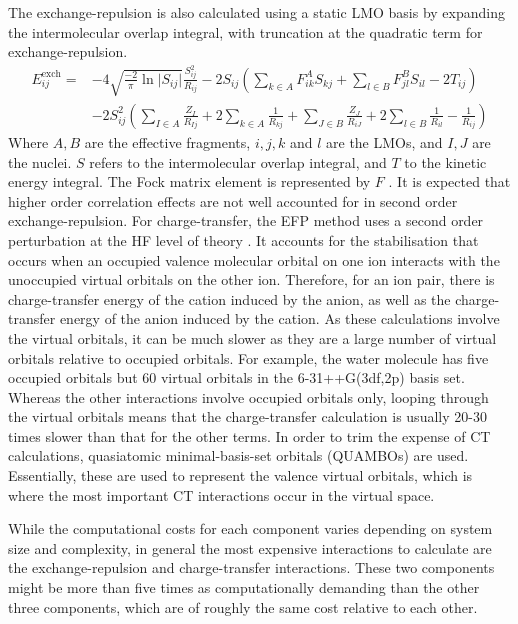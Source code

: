The exchange-repulsion is also calculated using a static LMO basis by expanding the intermolecular overlap integral, with truncation at the quadratic term for exchange-repulsion.
\begin{equation}
   \begin{split}
    E^{\text{exch}}_{ij} = & -4 \sqrt{\frac{-2}{\pi} \ln \lvert S_{ij} \rvert } \frac{S^2_{ij}}{R_{ij}} 
                             -2 S_{ij} \left( \sum_{k \in A} F^A_{ik} S_{kj} + \sum_{l \in B} F^B_{jl}S_{il} - 2 T_{ij} \right) \\
                             &  -2 S^2_{ij} \left( \sum_{I \in A} \frac{Z_I}{R_{Ij}}  + 2 \sum_{k \in A} \frac{1}{R_{kj}} + 
                                 \sum_{J \in B} \frac{Z_J}{R_{iJ}} + 2 \sum_{l \in B} \frac{1}{R_{il}} - \frac{1}{R_{ij}} \right)
   \end{split}
\end{equation}
Where $A,B$ are the effective fragments, $i, j, k$ and $l$ are the LMOs, and $I, J$ are the nuclei. 
$S$ refers to the intermolecular overlap integral, and $T$ to the kinetic energy integral.
The Fock matrix element is represented by $F$
\cite{Ghosh2010a}.
It is expected that higher order correlation effects are not well accounted for in second order exchange-repulsion.
For charge-transfer, the EFP method uses a second order perturbation at the HF level of theory
\cite{Li2006a}.
It accounts for the stabilisation that occurs when an occupied valence molecular orbital on one ion interacts with the unoccupied virtual orbitals on the other ion.
Therefore, for an ion pair, there is charge-transfer energy of the cation induced by the anion, as well as the charge-transfer energy of the anion induced by the cation.
As these calculations involve the virtual orbitals, it can be much slower as they are a large number of virtual orbitals relative to occupied orbitals. 
For example, the water molecule has five occupied orbitals but 60 virtual orbitals in the 6-31++G(3df,2p) basis set.
Whereas the other interactions involve occupied orbitals only, looping through the virtual orbitals means that the charge-transfer calculation is usually 20-30 times slower than that for the other terms.
\cite{Li2006a}
In order to trim the expense of CT calculations, quasiatomic minimal-basis-set orbitals (QUAMBOs) 
\cite{Lu2004a} 
are used.
Essentially, these are used to represent the valence virtual orbitals, which is where the most important CT interactions occur in the virtual space.


While the computational costs for each component varies depending on system size and complexity, in general the most expensive interactions to calculate are the exchange-repulsion and charge-transfer interactions.
These two components might be more than five times as computationally demanding than the other three components, which are of roughly the same cost relative to each other.


